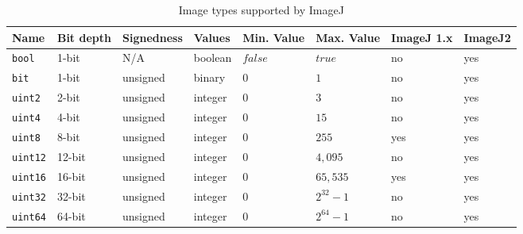\documentclass{bmcart}
\begin{document}
\begin{backmatter}
  \begin{table}[h!]
    \caption{Image types supported by ImageJ}
    \begin{tabular}{| l | l | l | p{0.4in} | p{0.8in} | p{0.8in} | l | l |}
      \hline
      \textbf{Name}            & \textbf{Bit depth} & \textbf{Signedness} & \textbf{Values} & \textbf{Min. Value}     & \textbf{Max. Value}    & \textbf{ImageJ 1.x} & \textbf{ImageJ2}  \\ \hline
      \texttt{bool}            & 1-bit              & N/A                 & boolean         & $false$                 & $true$                 & no                  & yes               \\ \hline
      \texttt{bit}             & 1-bit              & unsigned            & binary          & $0$                     & $1$                    & no                  & yes               \\ \hline
      \texttt{uint2}           & 2-bit              & unsigned            & integer         & $0$                     & $3$                    & no                  & yes               \\ \hline
      \texttt{uint4}           & 4-bit              & unsigned            & integer         & $0$                     & $15$                   & no                  & yes               \\ \hline
      \texttt{uint8}           & 8-bit              & unsigned            & integer         & $0$                     & $255$                  & yes                 & yes               \\ \hline
      \texttt{uint12}          & 12-bit             & unsigned            & integer         & $0$                     & $4,095$                & no                  & yes               \\ \hline
      \texttt{uint16}          & 16-bit             & unsigned            & integer         & $0$                     & $65,535$               & yes                 & yes               \\ \hline
      \texttt{uint32}          & 32-bit             & unsigned            & integer         & $0$                     & $2^{32} - 1$           & no                  & yes               \\ \hline
      \texttt{uint64}          & 64-bit             & unsigned            & integer         & $0$                     & $2^{64} - 1$           & no                  & yes               \\ \hline

\end{tabular}
\end{table}
\end{backmatter}
\end{document}
